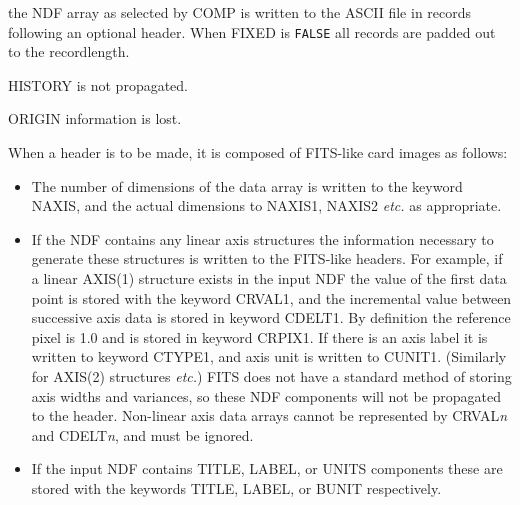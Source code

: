 \documentclass[twoside,11pt]{article}
\newcommand{\ssthitemlist}[1]{
  \latexonly{
  \mbox{} \\
  \vspace{-3.5ex}
  }
  \begin{itemize}
     #1
  \end{itemize}
}
\newcommand{\sstitem}{\item}
\newcommand{\sstitem}{\item}
\begin{document}
{{{         \sstitem
            the NDF array as selected by COMP is written to the ASCII
            file in records following an optional header.  When FIXED is
            \texttt{FALSE} all records are padded out to the recordlength.

         \sstitem
            HISTORY is not propagated.

         \sstitem
            ORIGIN information is lost.

         \sstitem
            When a header is to be made, it is composed of FITS-like card
            images as follows:
         \ssthitemlist{

            \sstitem
               The number of dimensions of the data array is written
               to the keyword NAXIS, and the actual dimensions to NAXIS1,
               NAXIS2 {\it etc.} as appropriate.

            \sstitem
               If the NDF contains any linear axis structures the
               information necessary to generate these structures is
               written to the FITS-like headers. For example, if a linear
               AXIS(1) structure exists in the input NDF the value of the
               first data point is stored with the keyword CRVAL1,
               and the incremental value between successive axis data is
               stored in keyword CDELT1.  By definition the reference pixel is
               1.0 and is stored in keyword CRPIX1.  If there is an axis label
               it is written to keyword CTYPE1, and axis unit is written to CUNIT1.
               (Similarly for AXIS(2) structures {\it etc.}) FITS does not have
               a standard method of storing axis widths and variances, so these
               NDF components will not be propagated to the header.
               Non-linear axis data arrays cannot be represented by CRVAL{\em{n}}
               and CDELT{\em{n}}, and must be ignored.

            \sstitem
               If the input NDF contains TITLE, LABEL, or UNITS components
               these are stored with the keywords TITLE, LABEL, or BUNIT
               respectively.

}}}}
\end{document}
